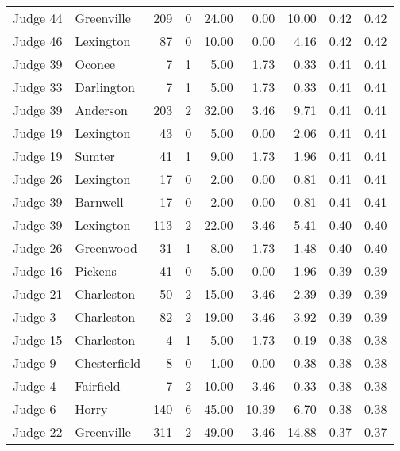 \begin{tabular}{llrrrrrrr}
Judge 44 &   Greenville &   209 &      0 & 24.00 &       0.00 &     10.00 &         0.42 &      0.42 \\
Judge 46 &    Lexington &    87 &      0 & 10.00 &       0.00 &      4.16 &         0.42 &      0.42 \\
Judge 39 &       Oconee &     7 &      1 &  5.00 &       1.73 &      0.33 &         0.41 &      0.41 \\
Judge 33 &   Darlington &     7 &      1 &  5.00 &       1.73 &      0.33 &         0.41 &      0.41 \\
Judge 39 &     Anderson &   203 &      2 & 32.00 &       3.46 &      9.71 &         0.41 &      0.41 \\
Judge 19 &    Lexington &    43 &      0 &  5.00 &       0.00 &      2.06 &         0.41 &      0.41 \\
Judge 19 &       Sumter &    41 &      1 &  9.00 &       1.73 &      1.96 &         0.41 &      0.41 \\
Judge 26 &    Lexington &    17 &      0 &  2.00 &       0.00 &      0.81 &         0.41 &      0.41 \\
Judge 39 &     Barnwell &    17 &      0 &  2.00 &       0.00 &      0.81 &         0.41 &      0.41 \\
Judge 39 &    Lexington &   113 &      2 & 22.00 &       3.46 &      5.41 &         0.40 &      0.40 \\
Judge 26 &    Greenwood &    31 &      1 &  8.00 &       1.73 &      1.48 &         0.40 &      0.40 \\
Judge 16 &      Pickens &    41 &      0 &  5.00 &       0.00 &      1.96 &         0.39 &      0.39 \\
Judge 21 &   Charleston &    50 &      2 & 15.00 &       3.46 &      2.39 &         0.39 &      0.39 \\
 Judge 3 &   Charleston &    82 &      2 & 19.00 &       3.46 &      3.92 &         0.39 &      0.39 \\
Judge 15 &   Charleston &     4 &      1 &  5.00 &       1.73 &      0.19 &         0.38 &      0.38 \\
 Judge 9 & Chesterfield &     8 &      0 &  1.00 &       0.00 &      0.38 &         0.38 &      0.38 \\
 Judge 4 &    Fairfield &     7 &      2 & 10.00 &       3.46 &      0.33 &         0.38 &      0.38 \\
 Judge 6 &        Horry &   140 &      6 & 45.00 &      10.39 &      6.70 &         0.38 &      0.38 \\
Judge 22 &   Greenville &   311 &      2 & 49.00 &       3.46 &     14.88 &         0.37 &      0.37 \\

\end{tabular}
